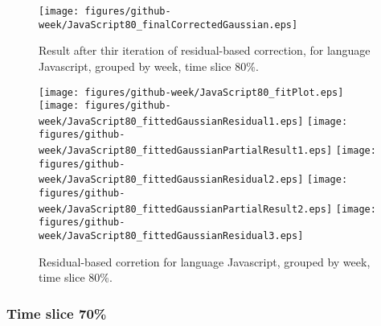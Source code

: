 \begin{figure}[]
\centering
{\texttt{[image: figures/github-week/JavaScript80\_finalCorrectedGaussian.eps]}}
\caption{Result after thir iteration of residual-based correction, for language Javascript, grouped by week, time slice 80\%.}
\end{figure}


\begin{figure}[hb]
\centering
{}
{\texttt{[image: figures/github-week/JavaScript80\_fitPlot.eps]}}
{\texttt{[image: figures/github-week/JavaScript80\_fittedGaussianResidual1.eps]}}
{\texttt{[image: figures/github-week/JavaScript80\_fittedGaussianPartialResult1.eps]}}
{\texttt{[image: figures/github-week/JavaScript80\_fittedGaussianResidual2.eps]}}
{\texttt{[image: figures/github-week/JavaScript80\_fittedGaussianPartialResult2.eps]}}
{\texttt{[image: figures/github-week/JavaScript80\_fittedGaussianResidual3.eps]}}
\caption{Residual-based corretion for language Javascript, grouped by week, time slice 80\%.}
\end{figure}


\clearpage 
\newpage 


\FloatBarrier

\subsubsection{Time slice 70\%}


